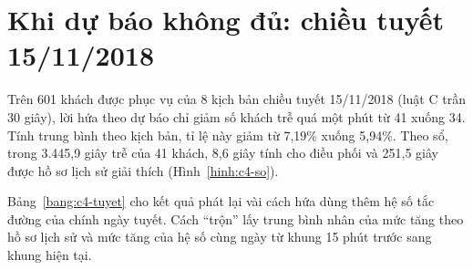 \section{Khi dự báo không đủ: chiều tuyết 15/11/2018}
\label{muc:c4-tuyet}

Trên 601 khách được phục vụ của 8 kịch bản chiều tuyết 15/11/2018 (luật C trần 30 giây), lời hứa theo dự báo chỉ giảm
số khách trễ quá một phút từ 41 xuống 34. Tính trung bình theo kịch bản, tỉ lệ này giảm từ 7,19\% xuống 5,94\%. Theo
sổ, trong 3.445,9 giây trễ của 41 khách, 8,6 giây tính cho điều phối và 251,5 giây được hồ sơ lịch sử giải thích
(Hình~\ref{hinh:c4-so}).

Bảng~\ref{bang:c4-tuyet} cho kết quả phát lại vài cách hứa dùng thêm hệ số tắc đường của chính ngày tuyết. Cách ``trộn'' lấy trung
bình nhân của mức tăng theo hồ sơ lịch sử và mức tăng của hệ số cùng ngày từ khung 15 phút trước sang khung hiện tại.

